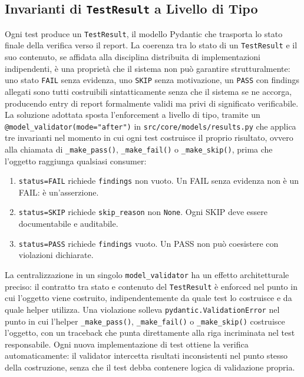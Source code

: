 \subsection{Invarianti di \texttt{TestResult} a Livello di Tipo}\label{subsec:testresult-invariants}

Ogni test produce un \texttt{TestResult}, il modello Pydantic che trasporta lo stato finale della verifica verso il report. La coerenza tra lo stato di un \texttt{TestResult} e il suo contenuto, se affidata alla disciplina distribuita di implementazioni indipendenti, è una proprietà che il sistema non può garantire strutturalmente: uno stato \texttt{FAIL} senza evidenza, uno \texttt{SKIP} senza motivazione, un \texttt{PASS} con findings allegati sono tutti costruibili sintatticamente senza che il sistema se ne accorga, producendo entry di report formalmente validi ma privi di significato verificabile. La soluzione adottata sposta l'enforcement a livello di tipo, tramite un \texttt{@model\_validator(mode="after")} in \texttt{src/core/models/results.py} che applica tre invarianti nel momento in cui ogni test costruisce il proprio risultato, ovvero alla chiamata di \texttt{\_make\_pass()}, \texttt{\_make\_fail()} o \texttt{\_make\_skip()}, prima che l'oggetto raggiunga qualsiasi consumer:

\begin{enumerate}
      \item \texttt{status=FAIL} richiede \texttt{findings} non vuoto. Un FAIL senza evidenza non è un FAIL: è un'asserzione.
      \item \texttt{status=SKIP} richiede \texttt{skip\_reason} non \texttt{None}. Ogni SKIP deve essere documentabile e auditabile.
      \item \texttt{status=PASS} richiede \texttt{findings} vuoto. Un PASS non può coesistere con violazioni dichiarate.
\end{enumerate}

La centralizzazione in un singolo \texttt{model\_validator} ha un effetto architetturale preciso: il contratto tra stato e contenuto del \texttt{TestResult} è enforced nel punto in cui l'oggetto viene costruito, indipendentemente da quale test lo costruisce e da quale helper utilizza. Una violazione solleva \texttt{pydantic.ValidationError} nel punto in cui l'helper \texttt{\_make\_pass()}, \texttt{\_make\_fail()} o \texttt{\_make\_skip()} costruisce l'oggetto, con un traceback che punta direttamente alla riga incriminata nel test responsabile. Ogni nuova implementazione di test ottiene la verifica automaticamente: il validator intercetta risultati inconsistenti nel punto stesso della costruzione, senza che il test debba contenere logica di validazione propria.


